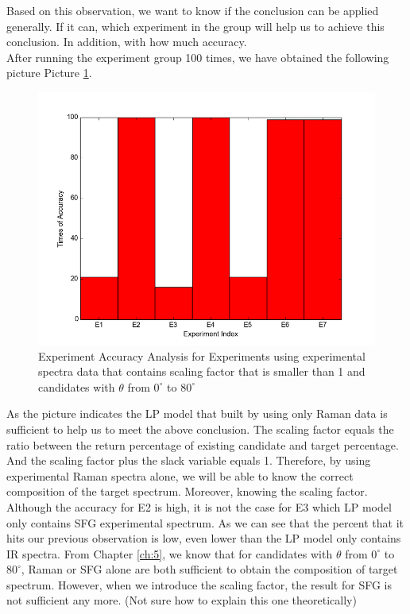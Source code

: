 Based on this observation, we want to know if the conclusion can be applied generally. If it can, which experiment in the group will help us to achieve this conclusion. In addition, with how much accuracy. \\

After running the experiment group 100 times, we have obtained the following picture Picture \ref{fig:6.1}.\\

\begin{figure}[!ht] 
\centering
\includegraphics[scale=0.3]{Figures/chapter6_1.png}
\caption{Experiment Accuracy Analysis for Experiments using experimental spectra data that contains scaling factor that is smaller than 1 and candidates with $\theta$ from $0^{\circ}$ to $80^{\circ}$}
\label{fig:6.1}
\end{figure}

As the picture indicates the LP model that built by using only Raman data is sufficient to help us to meet the above conclusion. The scaling factor equals the ratio between the return percentage of existing candidate and target percentage. And the scaling factor plus the slack variable equals 1. Therefore, by using experimental Raman spectra alone, we will be able to know the correct composition of the target spectrum. Moreover, knowing the scaling factor. \\
Although the accuracy for E2 is high, it is not the case for E3 which LP model only contains SFG experimental spectrum. As we can see that the percent that it hits our previous observation is low, even lower than the LP model only contains IR spectra. From Chapter \ref{ch:5}, we know that for candidates with $\theta$ from $0^{\circ}$ to $80^{\circ}$, Raman or SFG alone are both sufficient to obtain the composition of target spectrum. However, when we introduce the scaling factor, the result for SFG is not sufficient any more. (Not sure how to explain this one theoretically)\\

